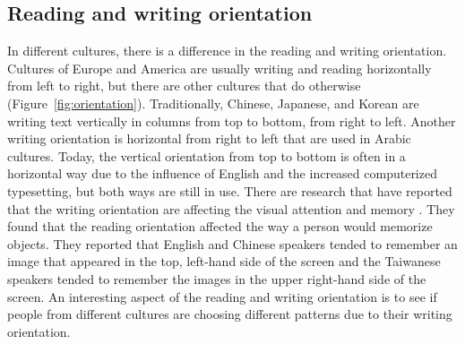       \subsection*{Reading and writing orientation}
      In different cultures, there is a difference in the reading and writing orientation. Cultures of Europe and America are usually writing and reading horizontally from left to right, but there are other cultures that do otherwise (Figure~\ref{fig:orientation}). Traditionally, Chinese, Japanese, and Korean are writing text vertically in columns from top to bottom, from right to left. Another writing orientation is horizontal from right to left that are used in Arabic cultures. Today, the vertical orientation from top to bottom is often in a horizontal way due to the influence of English and the increased computerized typesetting, but both ways are still in use. There are research that have reported that the writing orientation are affecting the visual attention and memory \cite{Chan}. They found that the reading orientation affected the way a person would memorize objects. They reported that English and Chinese speakers tended to remember an image that appeared in the top, left-hand side of the screen and the Taiwanese speakers tended to remember the images in the upper right-hand side of the screen. An interesting aspect of the reading and writing orientation is to see if people from different cultures are choosing different patterns due to their writing orientation. 

